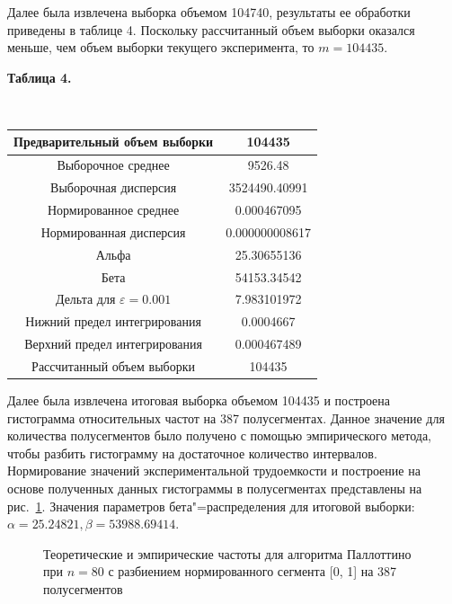 \documentclass[a4paper, article, 14pt]{extarticle}
\begin{document}
Далее была извлечена выборка объемом 104740, результаты ее обработки приведены в таблице 4. Поскольку рассчитанный объем выборки оказался меньше, чем объем выборки текущего эксперимента, то $m = 104435$.

\begin{center}\label{table4}
	\begin{small}
		\textbf{Таблица 4.}
	\end{small}\\
	\hfill \break
	\begin{tabular}{|c|c|}
		\hline
		Предварительный объем выборки & 104435\\
		\hline
		Выборочное среднее & 9526.48\\
		\hline
		Выборочная дисперсия & 3524490.40991\\
		\hline
		Нормированное среднее & 0.000467095\\
		\hline
		Нормированная дисперсия & 0.000000008617\\
		\hline
		Альфа & 25.30655136\\
		\hline
		Бета & 54153.34542\\
		\hline
		Дельта для $\varepsilon = 0.001$ & 7.983101972\\
		\hline
		Нижний предел интегрирования & 0.0004667\\
		\hline
		Верхний предел интегрирования & 0.000467489\\
		\hline
		Рассчитанный объем выборки & 104435\\
		\hline
	\end{tabular}
\end{center}

Далее была извлечена итоговая выборка объемом 104435 и построена гистограмма относительных частот на 387 полусегментах. Данное значение для количества полусегментов было получено с помощью эмпирического метода, чтобы разбить гистограмму на достаточное количество интервалов. Нормирование значений экспериментальной трудоемкости и построение на основе полученных данных гистограммы в полусегментах представлены на рис.~\ref{fig:histogram}. Значения параметров бета"=распределения для итоговой выборки: $\alpha = 25.24821, \beta = 53988.69414$.

\begin{figure}[!]
	\caption{Теоретические и эмпирические частоты для алгоритма Паллоттино при $n = 80$ с разбиением нормированного сегмента [0, 1] на 387 полусегментов}
	\label{fig:histogram}
\end{figure}
\end{document}
